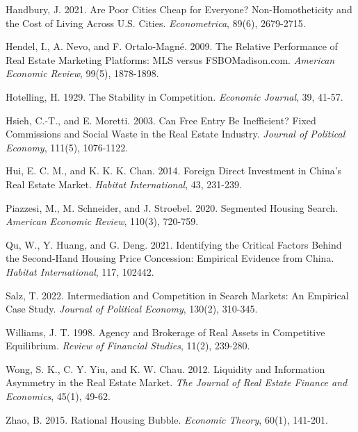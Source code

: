 \documentclass[11pt]{article}
\begin{document}
\begin{singlespace}
\begin{thebibliography}{}
  Handbury, J. 2021. Are Poor Cities Cheap for Everyone? Non-Homotheticity and the Cost of Living Across U.S. Cities. \textit{Econometrica}, 89(6), 2679-2715.
  
  Hendel, I., A. Nevo, and F. Ortalo-Magné. 2009. The Relative Performance of Real Estate Marketing Platforms: MLS versus FSBOMadison.com. \textit{American Economic Review}, 99(5), 1878-1898.
  
  Hotelling, H. 1929. The Stability in Competition. \textit{Economic Journal}, 39, 41-57.
  
  Hsieh, C.-T., and E. Moretti. 2003. Can Free Entry Be Inefficient? Fixed Commissions and Social Waste in the Real Estate Industry. \textit{Journal of Political Economy}, 111(5), 1076-1122.
  
  Hui, E. C. M., and K. K. K. Chan. 2014. Foreign Direct Investment in China's Real Estate Market. \textit{Habitat International}, 43, 231-239.
  
  Piazzesi, M., M. Schneider, and J. Stroebel. 2020. Segmented Housing Search. \textit{American Economic Review}, 110(3), 720-759.
  
  Qu, W., Y. Huang, and G. Deng. 2021. Identifying the Critical Factors Behind the Second-Hand Housing Price Concession: Empirical Evidence from China. \textit{Habitat International}, 117, 102442.
  
  Salz, T. 2022. Intermediation and Competition in Search Markets: An Empirical Case Study. \textit{Journal of Political Economy}, 130(2), 310-345.
  
  Williams, J. T. 1998. Agency and Brokerage of Real Assets in Competitive Equilibrium. \textit{Review of Financial Studies}, 11(2), 239-280.
  
  Wong, S. K., C. Y. Yiu, and K. W. Chau. 2012. Liquidity and Information Asymmetry in the Real Estate Market. \textit{The Journal of Real Estate Finance and Economics}, 45(1), 49-62.
  
  Zhao, B. 2015. Rational Housing Bubble. \textit{Economic Theory}, 60(1), 141-201.
  

\end{thebibliography}
\end{singlespace}
\end{document}
